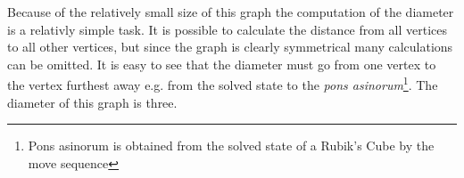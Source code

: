Because of the relatively small size of this graph the computation of the diameter is a relativly simple task. 
It is possible to calculate the distance from all vertices to all other vertices, but since the graph is clearly symmetrical many calculations can be omitted. 
It is easy to see that the diameter must go from one vertex to the vertex furthest away e.g. from the solved state to the \textit{pons asinorum}\footnote{Pons asinorum is obtained from the solved state of a Rubik's Cube by the move sequence }. 
The diameter of this graph is three. 


